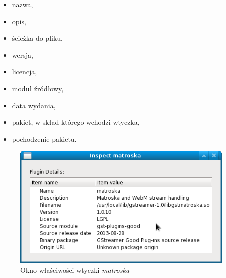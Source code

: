\documentclass[12pt]{article}
\begin{document}
\begin{minipage}{0.4\textwidth}
\begin{itemize}
  \setlength{\itemsep}{0em}
\item nazwa,
\item opis,
\item ścieżka do pliku,
\item wersja,
\item licencja,
\item moduł źródłowy,
\item data wydania,
\item pakiet, w skład którego wchodzi wtyczka,
\item pochodzenie pakietu.
\end{itemize}
\end{minipage}
\hfill
\begin{minipage}{0.55\textwidth}\raggedleft
\begin{figure}[H]
  \includegraphics[width=0.95\textwidth]{img/matroska-inspect-window.png}
  \caption{Okno właściwości wtyczki \textit{matroska}}
  \label{fig:matroskaInspectWindow}
\end{figure}
\end{minipage}
\vspace{6mm}
\end{document}
